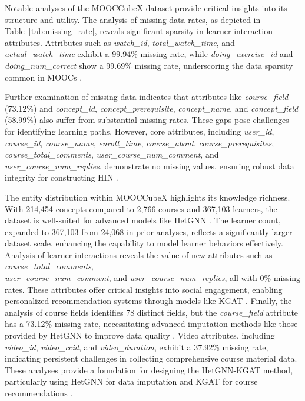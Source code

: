 \documentclass{ieeeaccess}
\begin{document}
Notable analyses of the MOOCCubeX dataset provide critical insights into its structure and utility. The analysis of missing data rates, as depicted in Table~\ref{tab:missing_rate}, reveals significant sparsity in learner interaction attributes. Attributes such as \textit{watch\_id}, \textit{total\_watch\_time}, and \textit{actual\_watch\_time} exhibit a 99.94\% missing rate, while \textit{doing\_exercise\_id} and \textit{doing\_num\_correct} show a 99.69\% missing rate, underscoring the data sparsity common in MOOCs \cite{kizilcec2015attrition_missing_MOOC}.

Further examination of missing data indicates that attributes like \textit{course\_field} (73.12\%) and \textit{concept\_id}, \textit{concept\_prerequisite}, \textit{concept\_name}, and \textit{concept\_field} (58.99\%) also suffer from substantial missing rates. These gaps pose challenges for identifying learning paths. However, core attributes, including \textit{user\_id}, \textit{course\_id}, \textit{course\_name}, \textit{enroll\_time}, \textit{course\_about}, \textit{course\_prerequisites},\\ \textit{course\_total\_comments}, \textit{user\_course\_num\_comment}, and \textit{user\_course\_num\_replies}, demonstrate no missing values, ensuring robust data integrity for constructing HIN \cite{shi2018heterogeneous}.

The entity distribution within MOOCCubeX highlights its knowledge richness. With 214,454 concepts compared to 2,766 courses and 367,103 learners, the dataset is well-suited for advanced models like HetGNN \cite{zhang2019hetgnn}. The learner count, expanded to 367,103 from 24,068 in prior analyses, reflects a significantly larger dataset scale, enhancing the capability to model learner behaviors effectively.
Analysis of learner interactions reveals the value of new attributes such as \textit{course\_total\_comments},\\ \textit{user\_course\_num\_comment}, and \textit{user\_course\_num\_replies}, all with 0\% missing rates. These attributes offer critical insights into social engagement, enabling personalized recommendation systems through models like KGAT \cite{wang2019kgat}.
Finally, the analysis of course fields identifies 78 distinct fields, but the \textit{course\_field} attribute has a 73.12\% missing rate, necessitating advanced imputation methods like those provided by HetGNN to improve data quality \cite{yu2021mooccubex}. Video attributes, including \textit{video\_id}, \textit{video\_ccid}, and \textit{video\_duration}, exhibit a 37.92\% missing rate, indicating persistent challenges in collecting comprehensive course material data.
These analyses provide a foundation for designing the HetGNN-KGAT method, particularly using HetGNN for data imputation and KGAT for course recommendations \cite{zhang2019hetgnn, shi2018heterogeneous, wang2019kgat}.
\end{document}
